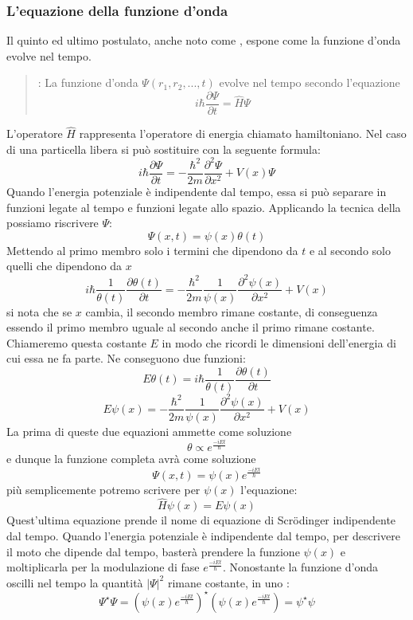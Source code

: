\subsubsection{L'equazione della funzione d'onda}
Il quinto ed ultimo postulato, anche noto come , espone come la funzione d'onda evolve nel tempo.
\begin{quote}
  : La funzione d'onda $\Psi(r_1, r_2, ..., t)$ evolve nel tempo secondo l'equazione
  $$i\hbar \frac{\partial \Psi}{\partial t} = \hat{H} \Psi$$
\end{quote}
L'operatore $\hat{H}$ rappresenta l'operatore di energia chiamato hamiltoniano. Nel caso di una particella libera si può sostituire con la seguente formula:
$$i \hbar \frac{\partial \Psi}{\partial t} = - \frac{\hbar^2}{2 m} \frac{\partial^2 \Psi}{\partial x^2} + V(x) \Psi$$
Quando l'energia potenziale è indipendente dal tempo, essa si può separare in funzioni legate al tempo e funzioni legate allo spazio. Applicando la tecnica della  possiamo riscrivere $\Psi$:
$$\Psi(x, t) = \psi(x) \theta(t)$$
Mettendo al primo membro solo i termini che dipendono da $t$ e al secondo solo quelli che dipendono da $x$
$$i \hbar \frac{1}{\theta(t)} \frac{\partial \theta(t)}{\partial t} = - \frac{\hbar^2}{2 m} \frac{1}{\psi(x)} \frac{\partial^2 \psi(x)}{\partial x^2} + V(x)$$
si nota che se $x$ cambia, il secondo membro rimane costante, di conseguenza essendo il primo membro uguale al secondo anche il primo rimane costante. Chiameremo questa costante $E$ in modo che ricordi le dimensioni dell'energia di cui essa ne fa parte. Ne conseguono due funzioni:
$$E \theta(t) = i \hbar \frac{1}{\theta(t)} \frac{\partial \theta(t)}{\partial t}$$
$$E \psi(x) = - \frac{\hbar^2}{2 m} \frac{1}{\psi(x)} \frac{\partial^2 \psi(x)}{\partial x^2} + V(x)$$
La prima di queste due equazioni ammette come soluzione
$$\theta \propto e^{\frac{-i E t}{\hbar}}$$
e dunque la funzione completa avrà come soluzione
$$\Psi(x, t) = \psi(x) e^{\frac{-i E t}{\hbar}}$$
più semplicemente potremo scrivere per $\psi(x)$ l'equazione:
$$\hat{H} \psi(x) = E \psi(x)$$
Quest'ultima equazione prende il nome di equazione di Scr\"odinger indipendente dal tempo.
Quando l'energia potenziale è indipendente dal tempo, per descrivere il moto che dipende dal tempo, basterà prendere la funzione $\psi(x)$ e moltiplicarla per la modulazione di fase $e^{\frac{-i E t}{\hbar}}$. Nonostante la funzione d'onda oscilli nel tempo la quantità ${\left|\Psi\right|}^2$ rimane costante, in uno :
$$\Psi^{\star} \Psi = {\left(\psi(x) e^{\frac{-i E t}{\hbar}}\right)}^{\star} \left(\psi(x) e^{\frac{-i E t}{\hbar}}\right) = \psi^{\star} \psi$$

